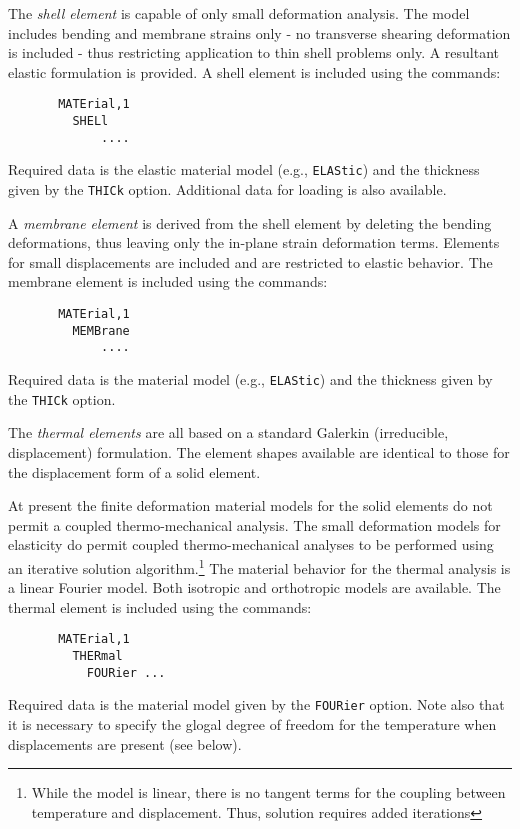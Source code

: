 The {\it shell element} is capable of only small deformation analysis. 
The model includes bending and membrane strains only -
no transverse shearing deformation is included - thus restricting application
to thin shell problems only.
A resultant elastic formulation is provided.
A shell element is included using the commands:
\begin{verbatim}
       MATErial,1
         SHELl
             ....
\end{verbatim}
Required data is the elastic material model (e.g., \texttt{ELAStic})
and the thickness given by the \texttt{THICk} option.
Additional data for loading is also available.

A {\it membrane element} is derived from the shell element by deleting
the bending deformations, thus leaving only the in-plane
strain deformation terms.  Elements for small displacements
are included and are restricted to elastic behavior.
The membrane element is included using the commands:
\begin{verbatim}
       MATErial,1
         MEMBrane
             ....
\end{verbatim}
Required data is the material model (e.g., \texttt{ELAStic}) and the thickness
given by the \texttt{THICk} option.

The {\it thermal elements} are all based on a standard Galerkin (irreducible,
displacement) formulation.  The
element shapes available are identical to those for the displacement
form of a solid element.

At present the finite deformation material
models for the solid elements do not permit a coupled thermo-mechanical
analysis.  The small deformation models for elasticity do permit coupled
thermo-mechanical analyses to be performed using an iterative solution
algorithm.\footnote{While the model is linear, there is no tangent terms for
the coupling between temperature and displacement.  Thus, solution requires
added iterations} The material behavior for the thermal analysis is a linear
Fourier model.  Both isotropic and orthotropic models are available.
The thermal element is included using the commands:
\begin{verbatim}
       MATErial,1
         THERmal
           FOURier ...
\end{verbatim}
Required data is the material model given by the \texttt{FOURier} option.
Note also that it is necessary to specify the glogal degree of freedom
for the temperature when displacements are present (see below).

